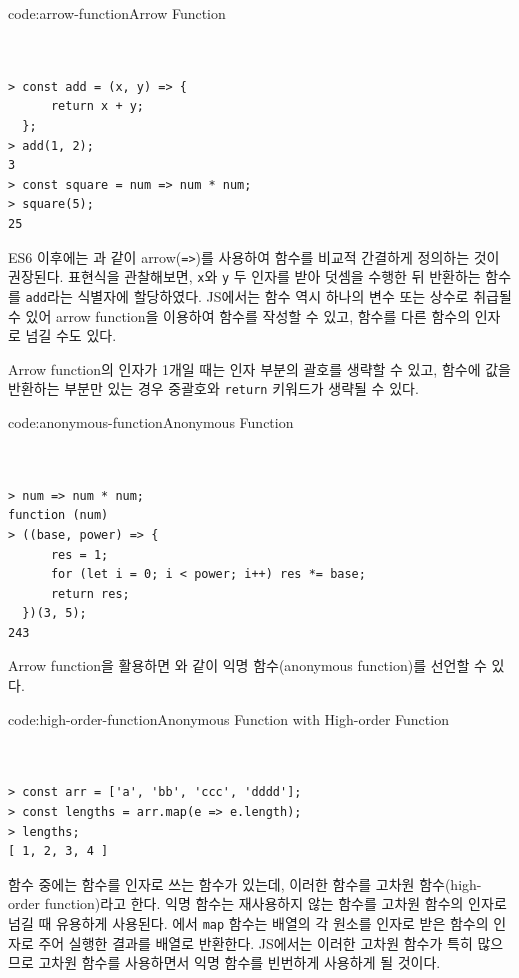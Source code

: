 \begin{codeenv}{code:arrow-function}{Arrow Function}\begin{verbatim}


> const add = (x, y) => {
      return x + y;
  };
> add(1, 2);
3
> const square = num => num * num;
> square(5);
25
\end{verbatim}
\end{codeenv}

ES6 이후에는 과 같이 arrow(\texttt{=>})를 사용하여 함수를 비교적 간결하게 정의하는 것이 권장된다. 표현식을 관찰해보면, \texttt{x}와 \texttt{y} 두 인자를 받아 덧셈을 수행한 뒤 반환하는 함수를 \texttt{add}라는 식별자에 할당하였다. JS에서는 함수 역시 하나의 변수 또는 상수로 취급될 수 있어 arrow function을 이용하여 함수를 작성할 수 있고, 함수를 다른 함수의 인자로 넘길 수도 있다.

Arrow function의 인자가 1개일 때는 인자 부분의 괄호를 생략할 수 있고, 함수에 값을 반환하는 부분만 있는 경우 중괄호와 \texttt{return} 키워드가 생략될 수 있다.

\begin{codeenv}{code:anonymous-function}{Anonymous Function}\begin{verbatim}


> num => num * num;
function (num)
> ((base, power) => {
      res = 1;
      for (let i = 0; i < power; i++) res *= base;
      return res;
  })(3, 5);
243
\end{verbatim}
\end{codeenv}

Arrow function을 활용하면 와 같이 익명 함수(anonymous function)를 선언할 수 있다.

\begin{codeenv}{code:high-order-function}{Anonymous Function with High-order Function}\begin{verbatim}


> const arr = ['a', 'bb', 'ccc', 'dddd'];
> const lengths = arr.map(e => e.length);
> lengths;
[ 1, 2, 3, 4 ]
\end{verbatim}
\end{codeenv}

함수 중에는 함수를 인자로 쓰는 함수가 있는데, 이러한 함수를 고차원 함수(high-order function)라고 한다. 익명 함수는 재사용하지 않는 함수를 고차원 함수의 인자로 넘길 때 유용하게 사용된다. 에서 \texttt{map} 함수는 배열의 각 원소를 인자로 받은 함수의 인자로 주어 실행한 결과를 배열로 반환한다. JS에서는 이러한 고차원 함수가 특히 많으므로 고차원 함수를 사용하면서 익명 함수를 빈번하게 사용하게 될 것이다.

